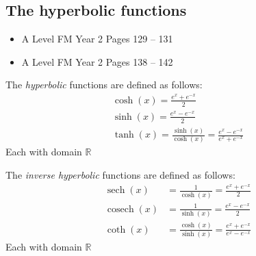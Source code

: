 \documentclass[11pt, a4paper]{article}
\DeclareMathOperator{\sech}{sech}
\DeclareMathOperator{\cosech}{cosech}
\begin{document}
\subsection{The hyperbolic functions}
\begin{itemize}
\item A Level FM Year 2 \hspace{1cm} \phantom{AS /} Pages 129 -- 131
\item A Level FM Year 2 \hspace{1cm} \phantom{AS /} Pages 138 -- 142
\end{itemize} \par
The \emph{hyperbolic} functions are defined as follows:
\begin{gather*}
\cosh(x)=\frac{e^{x}+e^{-x}}{2} \\
\sinh(x)=\frac{e^{x}-e^{-x}}{2} \\
\tanh(x)=\frac{\sinh(x)}{\cosh(x)}=\frac{e^{x}-e^{-x}}{e^{x}+e^{-x}}
\end{gather*}
Each with domain $\mathbb{R}$ \newline \par

The \emph{inverse hyperbolic} functions are defined as follows:
\begin{align*}
\sech(x)&=\frac{1}{\cosh(x)}=\frac{e^{x}+e^{-x}}{2} \\
\cosech(x)&=\frac{1}{\sinh(x)}=\frac{e^{x}-e^{-x}}{2} \\
\coth(x)&=\frac{\cosh(x)}{\sinh(x)}=\frac{e^{x}+e^{-x}}{e^{x}-e^{-x}}
\end{align*}
Each with domain $\mathbb{R}$
\vspace{0.5cm}

\newpage
\end{document}
